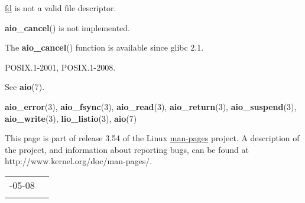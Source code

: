 \documentclass[]{article}
\let\realtextbf=\textbf
\renewcommand{\textbf}[1]{\textcolor{boldcolor}{\realtextbf{#1}}}
\renewcommand{\emph}[1]{\underline{#1}}
\begin{document}
\begin{description}
\itemsep1pt\parskip0pt
\item[\textbf{EBADF}]
\emph{fd} is not a valid file descriptor.
\end{description}

\begin{description}
\itemsep1pt\parskip0pt
\item[\textbf{ENOSYS}]
\textbf{aio\_cancel}() is not implemented.
\end{description}


The \textbf{aio\_cancel}() function is available since glibc 2.1.


POSIX.1-2001, POSIX.1-2008.


See \textbf{aio}(7).


\textbf{aio\_error}(3), \textbf{aio\_fsync}(3), \textbf{aio\_read}(3),
\textbf{aio\_return}(3), \textbf{aio\_suspend}(3),
\textbf{aio\_write}(3), \textbf{lio\_listio}(3), \textbf{aio}(7)


This page is part of release 3.54 of the Linux \emph{man-pages} project.
A description of the project, and information about reporting bugs, can
be found at http://www.kernel.org/doc/man-pages/.

\begin{longtable}[c]{@{}ll@{}}
\toprule\addlinespace
2012-05-08 &
\\\addlinespace
\bottomrule
\end{longtable}
\end{document}
